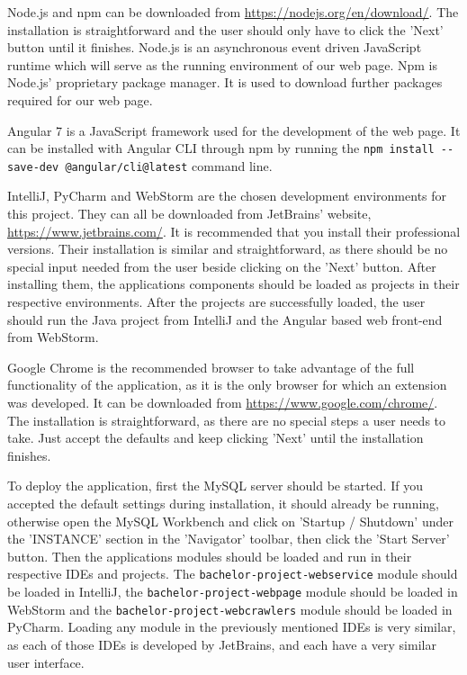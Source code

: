 \documentclass[12pt,a4paper,twoside]{report}
\begin{document}
Node.js and npm can be downloaded from \url{https://nodejs.org/en/download/}. The installation is straightforward and the user should only have to click the 'Next' button until it finishes. Node.js is an asynchronous event driven JavaScript runtime which will serve as the running environment of our web page. Npm is Node.js' proprietary package manager. It is used to download further packages required for our web page.

Angular 7 is a JavaScript framework used for the development of the web page. It can be installed with Angular CLI through npm by running the \lstinline$npm install --save-dev @angular/cli@latest$ command line.

IntelliJ, PyCharm and WebStorm are the chosen development environments for this project. They can all be downloaded from JetBrains' website, \url{https://www.jetbrains.com/}. It is recommended that you install their professional versions. Their installation is similar and straightforward, as there should be no special input needed from the user beside clicking on the 'Next' button. After installing them, the applications components should be loaded as projects in their respective environments. After the projects are successfully loaded, the user should run the Java project from IntelliJ and the Angular based web front-end from WebStorm.

Google Chrome is the recommended browser to take advantage of the full functionality of the application, as it is the only browser for which an extension was developed. It can be downloaded from \url{https://www.google.com/chrome/}. The installation is straightforward, as there are no special steps a user needs to take. Just accept the defaults and keep clicking 'Next' until the installation finishes.

To deploy the application, first the MySQL server should be started. If you accepted the default settings during installation, it should already be running, otherwise open the MySQL Workbench and click on 'Startup / Shutdown' under the 'INSTANCE' section in the 'Navigator' toolbar, then click the 'Start Server' button. Then the applications modules should be loaded and run in their respective IDEs and projects. The \lstinline$bachelor-project-webservice$ module should be loaded in IntelliJ, the \lstinline$bachelor-project-webpage$ module should be loaded in WebStorm and the \lstinline$bachelor-project-webcrawlers$ module should be loaded in PyCharm. Loading any module in the previously mentioned IDEs is very similar, as each of those IDEs is developed by JetBrains, and each have a very similar user interface.
\end{document}
